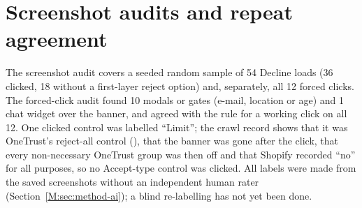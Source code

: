 \documentclass[preprint,11pt,authoryear,a4paper]{elsarticle}
\begin{document}
\section{Screenshot audits and repeat agreement}\label{sec:s-audit}

The screenshot audit covers a seeded random sample of 54 Decline loads (36 clicked, 18 without a first-layer reject option) and, separately, all 12 forced clicks. The forced-click audit found 10 modals or gates (e-mail, location or age) and 1 chat widget over the banner, and agreed with the rule for a working click on all 12. One clicked control was labelled ``Limit''; the crawl record shows that it was OneTrust's reject-all control (), that the banner was gone after the click, that every non-necessary OneTrust group was then off and that Shopify recorded ``no'' for all purposes, so no Accept-type control was clicked. All labels were made from the saved screenshots without an independent human rater (Section~\ref*{M:sec:method-ai}); a blind re-labelling has not yet been done.
\end{document}
